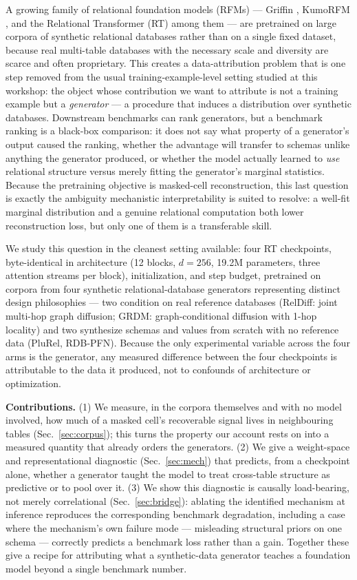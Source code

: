 \documentclass{article}
\begin{document}
A growing family of relational foundation models (RFMs) --- Griffin \cite{griffin}, KumoRFM \cite{kumorfm}, and the Relational Transformer (RT) \cite{rt} among them --- are pretrained on large corpora of synthetic relational databases rather than on a single fixed dataset, because real multi-table databases \cite{rdl,relbench} with the necessary scale and diversity are scarce and often proprietary. This creates a data-attribution problem that is one step removed from the usual training-example-level setting studied at this workshop: the object whose contribution we want to attribute is not a training example but a \emph{generator} --- a procedure that induces a distribution over synthetic databases. Downstream benchmarks can rank generators, but a benchmark ranking is a black-box comparison: it does not say what property of a generator's output caused the ranking, whether the advantage will transfer to schemas unlike anything the generator produced, or whether the model actually learned to \emph{use} relational structure versus merely fitting the generator's marginal statistics. Because the pretraining objective is masked-cell reconstruction, this last question is exactly the ambiguity mechanistic interpretability is suited to resolve: a well-fit marginal distribution and a genuine relational computation both lower reconstruction loss, but only one of them is a transferable skill.

We study this question in the cleanest setting available: four RT checkpoints, byte-identical in architecture (12 blocks, $d{=}256$, 19.2M parameters, three attention streams per block), initialization, and step budget, pretrained on corpora from four synthetic relational-database generators representing distinct design philosophies --- two condition on real reference databases (RelDiff: joint multi-hop graph diffusion; GRDM: graph-conditional diffusion with 1-hop locality) and two synthesize schemas and values from scratch with no reference data (PluRel, RDB-PFN). Because the only experimental variable across the four arms is the generator, any measured difference between the four checkpoints is attributable to the data it produced, not to confounds of architecture or optimization.

\textbf{Contributions.} (1) We measure, in the corpora themselves and with no model involved, how much of a masked cell's recoverable signal lives in neighbouring tables (Sec.~\ref{sec:corpus}); this turns the property our account rests on into a measured quantity that already orders the generators. (2) We give a weight-space and representational diagnostic (Sec.~\ref{sec:mech}) that predicts, from a checkpoint alone, whether a generator taught the model to treat cross-table structure as predictive or to pool over it. (3) We show this diagnostic is causally load-bearing, not merely correlational (Sec.~\ref{sec:bridge}): ablating the identified mechanism at inference reproduces the corresponding benchmark degradation, including a case where the mechanism's own failure mode --- misleading structural priors on one schema --- correctly predicts a benchmark loss rather than a gain. Together these give a recipe for attributing what a synthetic-data generator teaches a foundation model beyond a single benchmark number.
\end{document}
